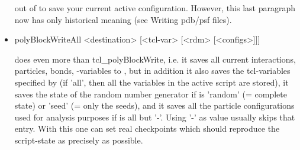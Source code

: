 \begin{itemize}
out of \es to save your current active configuration.  However, this
last paragraph now has only historical meaning (see Writing pdb/psf
files).
 \item
\begin{code}
polyBlockWriteAll <destination> [<tcl-var> [<rdm> [<configs>]]]
\end{code}

does even more than tcl\_polyBlockWrite, i.e. it saves all current
interactions, particles, bonds, \es{}-variables to ,
but in addition it also saves the tcl-variables specified by
 (if 'all', then all the variables in the active script
are stored), it saves the state of the random number generator if
 is 'random' (= complete state) or 'seed' (= only the seeds),
and it saves all the particle configurations used for analysis
purposes if  is all but '-'.  Using '-' as value usually
skips that entry.  With this one can set real checkpoints which should
reproduce the script-state as precisely as possible.
\end{itemize}



